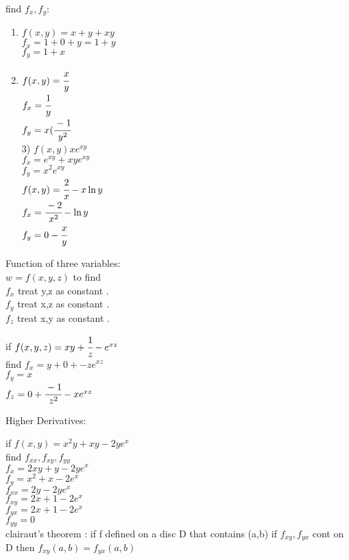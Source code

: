 \begin{example}
find $f_x , f_y$:
\begin{enumerate}
    \item $f(x,y) = x+y+xy $\\
$f_x = 1+0+y = 1+y $\\
$f_y = 1+x$
\item  $f(x,y) = \cfrac{x}{y}$\\
$f_x = \cfrac{1}{y}$\\
$f_y = x (\cfrac{-1}{y^{2}}$\\
3) $f(x,y) x e^{xy}$\\
$f_x = e^{xy} + xye^{xy}$\\
$f_y = x^{2}e^{xy}$\\
$f(x,y) = \cfrac{2}{x} -x\ln y$\\
$f_x = \cfrac{-2}{x^{2}} -\ln y$\\
$f_y = 0-\cfrac{x}{y}$
\end{enumerate}
\end{example}
\noindent{\color{smalt(darkpowderblue)}\rule{\linewidth}{.2mm}}
Function of three variables: \\
$w = f(x,y,z)$ to find \\
$f_x$ treat y,z as constant . \\
$f_y$ treat x,z as constant . \\
$f_z$ treat x,y as constant . \\
\begin{example}
if $f(x,y,z) = xy +\cfrac{1}{z} - e^{xz}$\\
find $f_x = y+0+-z e^{xz}$\\
$f_y = x$\\
$f_z = 0+\cfrac{-1}{z^{2}} - xe^{xz}$
\end{example}
Higher Derivatives:
\noindent{\color{smalt(darkpowderblue)}\rule{\linewidth}{.2mm}}
\begin{example}
if $f(x,y) = x^{2} y + xy - 2ye^{x}$\\
find $f_{xx} , f_{xy} , f_{yy} $\\
$f_x = 2xy + y- 2ye^{x}$\\
$f_y = x^{2} + x- 2e^{x}$\\
$f_{xx} = 2y - 2ye^{x}$\\
$f_{xy} = 2x + 1 - 2e^{x}$\\
$f_{yx} = 2x+1-2e^{x} $\\
$f_{yy} = 0$\\
clairaut’s theorem : if f defined on a disc D that contains (a,b)
 if $f_{xy} , f_{yx} $ cont on D then $f_{xy}(a,b) = f_{yx}(a,b)$
\end{example}
\noindent{\color{smalt(darkpowderblue)}\rule{\linewidth}{.2mm}}

